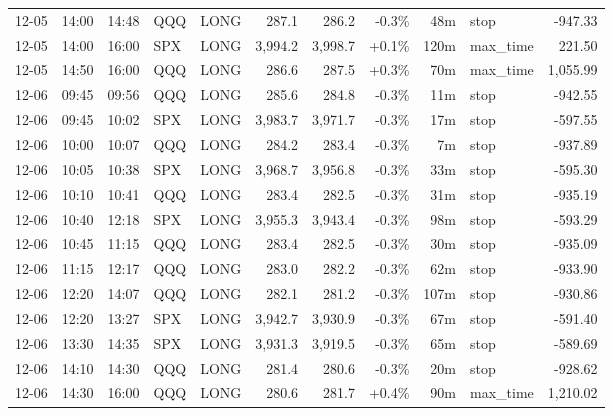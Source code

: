 \documentclass[11pt,a4paper,twoside]{article}
\begin{document}
\begin{center}
\begin{longtable}{>{\color{txtmain}}l l l l l r r r r >{\color{txtmain}}l r}
12-05 & 14:00 & 14:48 & QQQ & LONG & 287.1 & 286.2 & \textcolor{lossred}{-0.3\%} & 48m & stop & \textcolor{lossred}{-947.33} \\
12-05 & 14:00 & 16:00 & SPX & LONG & 3,994.2 & 3,998.7 & \textcolor{wingreen}{+0.1\%} & 120m & max\_time & \textcolor{wingreen}{221.50} \\
12-05 & 14:50 & 16:00 & QQQ & LONG & 286.6 & 287.5 & \textcolor{wingreen}{+0.3\%} & 70m & max\_time & \textcolor{wingreen}{1,055.99} \\
12-06 & 09:45 & 09:56 & QQQ & LONG & 285.6 & 284.8 & \textcolor{lossred}{-0.3\%} & 11m & stop & \textcolor{lossred}{-942.55} \\
12-06 & 09:45 & 10:02 & SPX & LONG & 3,983.7 & 3,971.7 & \textcolor{lossred}{-0.3\%} & 17m & stop & \textcolor{lossred}{-597.55} \\
12-06 & 10:00 & 10:07 & QQQ & LONG & 284.2 & 283.4 & \textcolor{lossred}{-0.3\%} & 7m & stop & \textcolor{lossred}{-937.89} \\
12-06 & 10:05 & 10:38 & SPX & LONG & 3,968.7 & 3,956.8 & \textcolor{lossred}{-0.3\%} & 33m & stop & \textcolor{lossred}{-595.30} \\
12-06 & 10:10 & 10:41 & QQQ & LONG & 283.4 & 282.5 & \textcolor{lossred}{-0.3\%} & 31m & stop & \textcolor{lossred}{-935.19} \\
12-06 & 10:40 & 12:18 & SPX & LONG & 3,955.3 & 3,943.4 & \textcolor{lossred}{-0.3\%} & 98m & stop & \textcolor{lossred}{-593.29} \\
12-06 & 10:45 & 11:15 & QQQ & LONG & 283.4 & 282.5 & \textcolor{lossred}{-0.3\%} & 30m & stop & \textcolor{lossred}{-935.09} \\
12-06 & 11:15 & 12:17 & QQQ & LONG & 283.0 & 282.2 & \textcolor{lossred}{-0.3\%} & 62m & stop & \textcolor{lossred}{-933.90} \\
12-06 & 12:20 & 14:07 & QQQ & LONG & 282.1 & 281.2 & \textcolor{lossred}{-0.3\%} & 107m & stop & \textcolor{lossred}{-930.86} \\
12-06 & 12:20 & 13:27 & SPX & LONG & 3,942.7 & 3,930.9 & \textcolor{lossred}{-0.3\%} & 67m & stop & \textcolor{lossred}{-591.40} \\
12-06 & 13:30 & 14:35 & SPX & LONG & 3,931.3 & 3,919.5 & \textcolor{lossred}{-0.3\%} & 65m & stop & \textcolor{lossred}{-589.69} \\
12-06 & 14:10 & 14:30 & QQQ & LONG & 281.4 & 280.6 & \textcolor{lossred}{-0.3\%} & 20m & stop & \textcolor{lossred}{-928.62} \\
12-06 & 14:30 & 16:00 & QQQ & LONG & 280.6 & 281.7 & \textcolor{wingreen}{+0.4\%} & 90m & max\_time & \textcolor{wingreen}{1,210.02} \\

\end{longtable}
\end{center}
\end{document}
